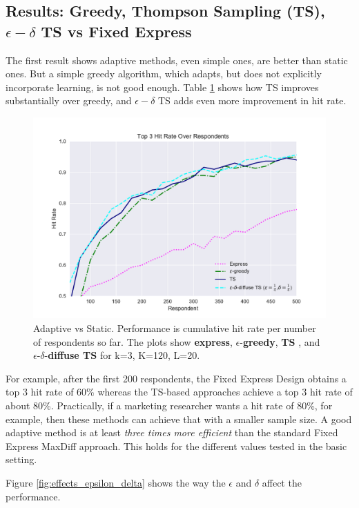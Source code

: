 \documentclass[a4paper,12pt]{article}
\newcommand{\fixedexpress}{\textbf{express}}
\newcommand{\egreedy}{$\epsilon$-\textbf{greedy}}
\newcommand{\ts}{\textbf{TS} }
\newcommand{\edts}{$\epsilon$-$\delta$-\textbf{diffuse TS} }
\begin{document}
\subsection{Results: Greedy, Thompson Sampling (TS), $\epsilon-\delta$ TS vs Fixed Express}

The first result shows adaptive methods, even simple ones, are better than static ones. But a simple greedy algorithm, which adapts, but does not explicitly incorporate learning, is not good enough. Table \ref{fig:simple_result} shows how TS improves substantially over greedy, and $\epsilon-\delta$ TS adds even more improvement in hit rate.

\begin{figure}
\caption{Adaptive vs Static. Performance is cumulative hit rate per number of respondents so far. The plots show \fixedexpress, \egreedy, \ts, and \edts for k=3, K=120, L=20.}
\label{fig:simple_result}
\begin{center}
	\includegraphics[width=.8\textwidth]{plots/hr120v20k3.pdf}
\end{center}
\end{figure}

For example, after the first 200 respondents, the Fixed Express Design obtains a top 3 hit rate of 60\% whereas the TS-based approaches achieve a top 3 hit rate of about 80\%. Practically, if a marketing researcher wants a hit rate of 80\%, for example, then these methods can achieve that with a smaller sample size. A good adaptive method is at least \emph{three times more efficient} than the standard Fixed Express MaxDiff approach. This holds for the different values tested in the basic setting. 

Figure \ref{fig:effects_epsilon_delta} shows the way the $\epsilon$ and $\delta$ affect the performance. 
\end{document}
